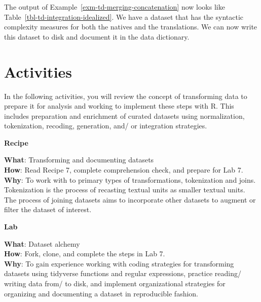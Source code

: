 \documentclass[
  letterpaper,
]{latex/krantz}
\theoremstyle{definition}
\theoremstyle{remark}
\begin{document}
The output of Example~\ref{exm-td-merging-concatenation} now looks like
Table~\ref{tbl-td-integration-idealized}. We have a dataset that has the
syntactic complexity measures for both the natives and the translations.
We can now write this dataset to disk and document it in the data
dictionary.

\section*{Activities}\label{activities-5}


In the following activities, you will review the concept of transforming
data to prepare it for analysis and working to implement these steps
with R. This includes preparation and enrichment of curated datasets
using normalization, tokenization, recoding, generation, and/ or
integration strategies.

\begin{tcolorbox}[enhanced jigsaw, breakable, leftrule=.75mm, arc=.35mm, colframe=quarto-callout-color-frame, colback=white, left=2mm, bottomrule=.15mm, rightrule=.15mm, toprule=.15mm, opacityback=0]

\textbf{ Recipe}

\textbf{What}: Transforming and documenting datasets\\
\textbf{How}: Read Recipe 7, complete comprehension check, and prepare
for Lab 7.\\
\textbf{Why}: To work with to primary types of transformations,
tokenization and joins. Tokenization is the process of recasting textual
units as smaller textual units. The process of joining datasets aims to
incorporate other datasets to augment or filter the dataset of interest.

\end{tcolorbox}

\begin{tcolorbox}[enhanced jigsaw, breakable, leftrule=.75mm, arc=.35mm, colframe=quarto-callout-color-frame, colback=white, left=2mm, bottomrule=.15mm, rightrule=.15mm, toprule=.15mm, opacityback=0]

\textbf{ Lab}

\textbf{What}: Dataset alchemy\\
\textbf{How}: Fork, clone, and complete the steps in Lab 7.\\
\textbf{Why}: To gain experience working with coding strategies for
transforming datasets using tidyverse functions and regular expressions,
practice reading/ writing data from/ to disk, and implement
organizational strategies for organizing and documenting a dataset in
reproducible fashion.

\end{tcolorbox}
\end{document}
